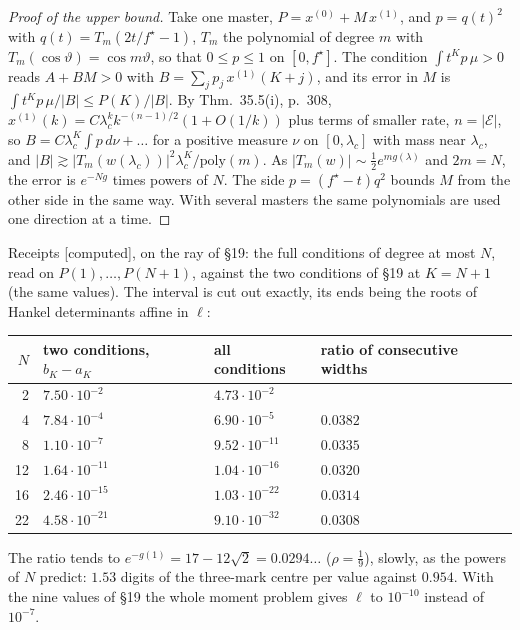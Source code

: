 \documentclass[11pt]{article}
\newcommand{\cE}{\mathcal E}
\theoremstyle{plain}
\theoremstyle{definition}
\theoremstyle{remark}
\newcommand{\computed}{\textup{[computed]}}
\begin{document}
\begin{proof}[Proof of the upper bound]
Take one master, $P=x^{(0)}+M\,x^{(1)}$, and $p=q(t)^2$ with $q(t)=T_m(2t/f^\star-1)$, $T_m$ the polynomial of degree $m$ with $T_m(\cos\vartheta)=\cos m\vartheta$, so that $0\le p\le1$ on $[0,f^\star]$. The condition $\int t^Kp\,\mu>0$ reads $A+BM>0$ with $B=\sum_jp_j\,x^{(1)}(K+j)$, and its error in $M$ is $\int t^Kp\,\mu/|B|\le P(K)/|B|$. By Thm.~35.5(i), p.~308, $x^{(1)}(k)=C\lambda_c^kk^{-(n-1)/2}(1+O(1/k))$ plus terms of smaller rate, $n=|\cE|$, so $B=C\lambda_c^K\int p\,d\nu+\dots$ for a positive measure $\nu$ on $[0,\lambda_c]$ with mass near $\lambda_c$, and $|B|\gtrsim|T_m(w(\lambda_c))|^2\lambda_c^K/\mathrm{poly}(m)$. As $|T_m(w)|\sim\frac12e^{mg(\lambda)}$ and $2m=N$, the error is $e^{-Ng}$ times powers of $N$. The side $p=(f^\star-t)q^2$ bounds $M$ from the other side in the same way. With several masters the same polynomials are used one direction at a time.
\end{proof}

\noindent Receipts \computed, on the ray of \S19: the full conditions of degree at most $N$, read on $P(1),\dots,P(N+1)$, against the two conditions of \S19 at $K=N+1$ (the same values). The interval is cut out exactly, its ends being the roots of Hankel determinants affine in $\ell$:
\begin{center}
\small
\begin{tabular}{@{}r l l l@{}}
\toprule
$N$ & two conditions, $b_K-a_K$ & all conditions & ratio of consecutive widths\\ \midrule
2 & $7.50\cdot10^{-2}$ & $4.73\cdot10^{-2}$ & \\
4 & $7.84\cdot10^{-4}$ & $6.90\cdot10^{-5}$ & $0.0382$\\
8 & $1.10\cdot10^{-7}$ & $9.52\cdot10^{-11}$ & $0.0335$\\
12 & $1.64\cdot10^{-11}$ & $1.04\cdot10^{-16}$ & $0.0320$\\
16 & $2.46\cdot10^{-15}$ & $1.03\cdot10^{-22}$ & $0.0314$\\
22 & $4.58\cdot10^{-21}$ & $9.10\cdot10^{-32}$ & $0.0308$\\
\bottomrule
\end{tabular}
\end{center}
The ratio tends to $e^{-g(1)}=17-12\sqrt2=0.0294\ldots$ ($\rho=\frac19$), slowly, as the powers of $N$ predict: $1.53$ digits of the three-mark centre per value against $0.954$. With the nine values of \S19 the whole moment problem gives $\ell$ to $10^{-10}$ instead of $10^{-7}$.
\end{document}
